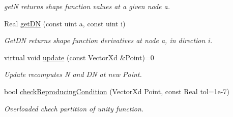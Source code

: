 \begin{DoxyCompactItemize}
\begin{DoxyCompactList}\small\item\em getN returns shape function values at a given node a. \item\end{DoxyCompactList}\item 
\hypertarget{classvoom_1_1_m_f_shape_aaf08c83e834d1029ba5d79aafddf04b7}{
Real \hyperlink{classvoom_1_1_m_f_shape_aaf08c83e834d1029ba5d79aafddf04b7}{getDN} (const uint a, const uint i)}
\label{classvoom_1_1_m_f_shape_aaf08c83e834d1029ba5d79aafddf04b7}

\begin{DoxyCompactList}\small\item\em GetDN returns shape function derivatives at node a, in direction i. \item\end{DoxyCompactList}\item 
\hypertarget{classvoom_1_1_m_f_shape_ac28a00ce0362f60185eab72f5cc0e1b3}{
virtual void \hyperlink{classvoom_1_1_m_f_shape_ac28a00ce0362f60185eab72f5cc0e1b3}{update} (const VectorXd \&Point)=0}
\label{classvoom_1_1_m_f_shape_ac28a00ce0362f60185eab72f5cc0e1b3}

\begin{DoxyCompactList}\small\item\em Update recomputes N and DN at new Point. \item\end{DoxyCompactList}\item 
\hypertarget{classvoom_1_1_m_f_shape_a79031a3dd48b794e838f8bf26fc22300}{
bool \hyperlink{classvoom_1_1_m_f_shape_a79031a3dd48b794e838f8bf26fc22300}{checkReproducingCondition} (VectorXd Point, const Real tol=1e-\/7)}
\label{classvoom_1_1_m_f_shape_a79031a3dd48b794e838f8bf26fc22300}

\begin{DoxyCompactList}\small\item\em Overloaded chech partition of unity function. \item\end{DoxyCompactList}\end{DoxyCompactItemize}
